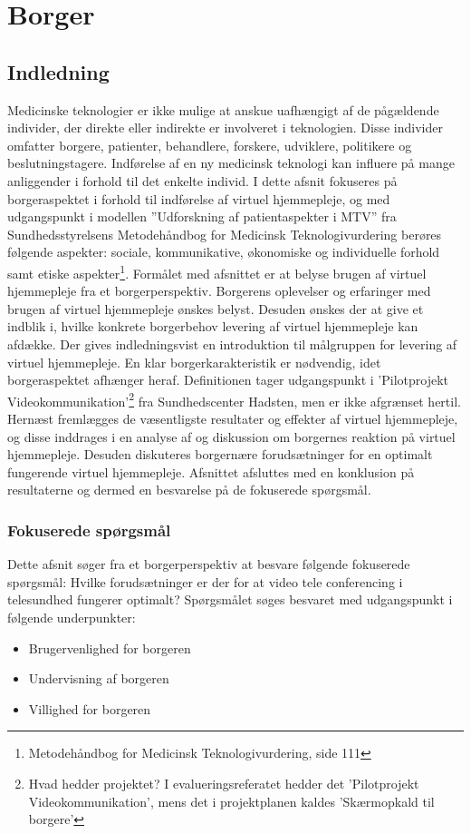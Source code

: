 \chapter{Borger}

\section{Indledning}
Medicinske teknologier er ikke mulige at anskue uafhængigt af de pågældende individer, der direkte eller indirekte er involveret i teknologien. Disse individer omfatter borgere, patienter, behandlere, forskere, udviklere, politikere og beslutningstagere. Indførelse af en ny medicinsk teknologi kan influere på mange anliggender i forhold til det enkelte individ. I dette afsnit fokuseres på borgeraspektet i forhold til indførelse af virtuel hjemmepleje, og med udgangspunkt i modellen ”Udforskning af patientaspekter i MTV” fra Sundhedsstyrelsens Metodehåndbog for Medicinsk Teknologivurdering berøres følgende aspekter: sociale, kommunikative, økonomiske og individuelle forhold samt etiske aspekter\footnote{Metodehåndbog for Medicinsk Teknologivurdering, side 111}. 
Formålet med afsnittet er at belyse brugen af virtuel hjemmepleje fra et borgerperspektiv. Borgerens oplevelser og erfaringer med brugen af virtuel hjemmepleje ønskes belyst. Desuden ønskes der at give et indblik i, hvilke konkrete borgerbehov levering af virtuel hjemmepleje kan afdække. 
Der gives indledningsvist en introduktion til målgruppen for levering af virtuel hjemmepleje. En klar borgerkarakteristik er nødvendig, idet borgeraspektet afhænger heraf. Definitionen tager udgangspunkt i ’Pilotprojekt Videokommunikation’\footnote{Hvad hedder projektet? I evalueringsreferatet hedder det ’Pilotprojekt Videokommunikation’, mens det i projektplanen kaldes ’Skærmopkald til borgere’} fra Sundhedscenter Hadsten, men er ikke afgrænset hertil. 
Hernæst fremlægges de væsentligste resultater og effekter af virtuel hjemmepleje, og disse inddrages i en analyse af og diskussion om borgernes reaktion på virtuel hjemmepleje. Desuden diskuteres borgernære forudsætninger for en optimalt fungerende virtuel hjemmepleje. Afsnittet afsluttes med en konklusion på resultaterne og dermed en besvarelse på de fokuserede spørgsmål.

\subsection{Fokuserede spørgsmål}
Dette afsnit søger fra et borgerperspektiv at besvare følgende fokuserede spørgsmål: 
Hvilke forudsætninger er der for at video tele conferencing i telesundhed fungerer optimalt?
Spørgsmålet søges besvaret med udgangspunkt i følgende underpunkter:
\begin{itemize}
	\item Brugervenlighed for borgeren
	\item Undervisning af borgeren
	\item Villighed for borgeren
\end{itemize}

